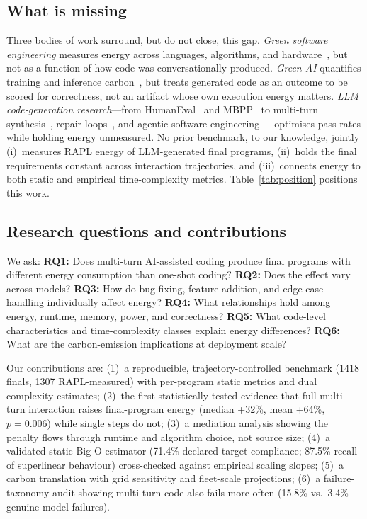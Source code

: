 \documentclass[journal]{IEEEtran}
\begin{document}
\subsection{What is missing}
Three bodies of work surround, but do not close, this gap.
\emph{Green software engineering} measures energy across languages,
algorithms, and hardware~\cite{pereira2017, pinto2014, calero2015}, but not
as a function of how code was conversationally produced.
\emph{Green AI} quantifies training and inference carbon~\cite{schwartz2020,
strubell2019, patterson2021, lacoste2019, henderson2020, luccioni2022,
codecarbon2021}, but treats generated code as an outcome to be scored for
correctness, not an artifact whose own execution energy matters.
\emph{LLM code-generation research}---from HumanEval~\cite{chen2021} and
MBPP~\cite{austin2021} to multi-turn synthesis~\cite{nijkamp2023}, repair
loops~\cite{madaan2023, shinn2023, chen2023selfdebug}, and agentic software
engineering~\cite{jimenez2024, sweagent2024}---optimises pass rates while
holding energy unmeasured. No prior benchmark, to our knowledge, jointly
(i)~measures RAPL energy of LLM-generated final programs, (ii)~holds the
final requirements constant across interaction trajectories, and
(iii)~connects energy to both static and empirical time-complexity metrics.
Table~\ref{tab:position} positions this work.

\subsection{Research questions and contributions}
We ask:
\textbf{RQ1:} Does multi-turn AI-assisted coding produce final programs with
different energy consumption than one-shot coding?
\textbf{RQ2:} Does the effect vary across models?
\textbf{RQ3:} How do bug fixing, feature addition, and edge-case handling
individually affect energy?
\textbf{RQ4:} What relationships hold among energy, runtime, memory, power,
and correctness?
\textbf{RQ5:} What code-level characteristics and time-complexity classes
explain energy differences?
\textbf{RQ6:} What are the carbon-emission implications at deployment scale?

Our contributions are: (1)~a reproducible, trajectory-controlled benchmark
(1418 finals, 1307 RAPL-measured) with per-program static metrics and dual
complexity estimates; (2)~the first statistically tested evidence that full
multi-turn interaction raises final-program energy (median +32\%,
mean +64\%, $p{=}0.006$) while single steps do not; (3)~a mediation analysis
showing the penalty flows through runtime and algorithm choice, not source
size; (4)~a validated static Big-O estimator (71.4\% declared-target
compliance; 87.5\% recall of superlinear behaviour) cross-checked against
empirical scaling slopes; (5)~a carbon translation with grid sensitivity and
fleet-scale projections; (6)~a failure-taxonomy audit showing multi-turn
code also fails more often (15.8\% vs.\ 3.4\% genuine model failures).
\end{document}
